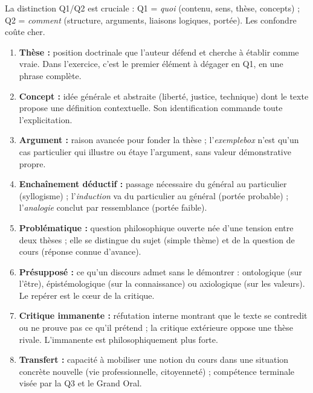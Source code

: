 \documentclass[11pt]{article}
\begin{document}
\begin{attention}
La distinction Q1/Q2 est cruciale : Q1 = \emph{quoi} (contenu, sens, thèse, concepts) ; Q2 = \emph{comment} (structure, arguments, liaisons logiques, portée). Les confondre coûte cher.
\end{attention}

\begin{corrige}
\begin{enumerate}
    \item \textbf{Thèse :} position doctrinale que l'auteur défend et cherche à établir comme vraie. Dans l'exercice, c'est le premier élément à dégager en Q1, en une phrase complète.
    \item \textbf{Concept :} idée générale et abstraite (liberté, justice, technique) dont le texte propose une définition contextuelle. Son identification commande toute l'explicitation.
    \item \textbf{Argument :} raison avancée pour fonder la thèse ; l'\emph{exemplebox} n'est qu'un cas particulier qui illustre ou étaye l'argument, sans valeur démonstrative propre.
    \item \textbf{Enchaînement déductif :} passage nécessaire du général au particulier (syllogisme) ; l'\emph{induction} va du particulier au général (portée probable) ; l'\emph{analogie} conclut par ressemblance (portée faible).
    \item \textbf{Problématique :} question philosophique ouverte née d'une tension entre deux thèses ; elle se distingue du sujet (simple thème) et de la question de cours (réponse connue d'avance).
    \item \textbf{Présupposé :} ce qu'un discours admet sans le démontrer : ontologique (sur l'être), épistémologique (sur la connaissance) ou axiologique (sur les valeurs). Le repérer est le cœur de la critique.
    \item \textbf{Critique immanente :} réfutation interne montrant que le texte se contredit ou ne prouve pas ce qu'il prétend ; la critique extérieure oppose une thèse rivale. L'immanente est philosophiquement plus forte.
    \item \textbf{Transfert :} capacité à mobiliser une notion du cours dans une situation concrète nouvelle (vie professionnelle, citoyenneté) ; compétence terminale visée par la Q3 et le Grand Oral.
\end{enumerate}
\end{corrige}
\end{document}
